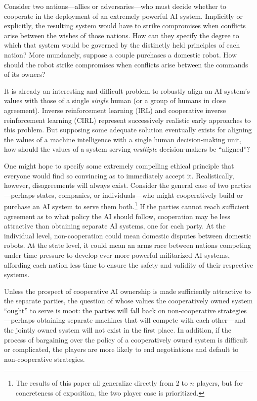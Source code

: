 \documentclass{article}  %
\begin{document}
Consider two nations---allies or adversaries---who must decide whether to cooperate in the deployment of an extremely powerful AI system.  Implicitly or explicitly, the resulting system would have to strike compromises when conflicts arise between the wishes of those nations.  How can they specify the degree to which that system would be governed by the distinctly held principles of each nation?  More mundanely, suppose a couple purchases a domestic robot.  How should the robot strike compromises when conflicts arise between the commands of its owners?

It is already an interesting and difficult problem to robustly align an AI system's values with those of a single \emph{single} human (or a group of humans in close agreement).  Inverse reinforcement learning (IRL) \cite{Ru98} \cite{NR00} \cite {AN04} and cooperative inverse reinforcement learning (CIRL) \cite{HDAR16} represent successively realistic early approaches to this problem.  But supposing some adequate solution eventually exists for aligning the values of a machine intelligence with a single human decision-making unit, how should the values of a system serving \emph{multiple} decision-makers be ``aligned''?

One might hope to specify some extremely compelling ethical principle that everyone would find so convincing as to immediately accept it.  Realistically, however, disagreements will always exist.  Consider the general case of two parties---perhaps states, companies, or individuals---who might cooperatively build or purchase an AI system to serve them both.\footnote{The results of this paper all generalize directly from $2$ to $n$ players, but for concreteness of exposition, the two player case is prioritized.}   If the parties cannot reach sufficient agreement as to what policy the AI should follow, cooperation may be less attractive than obtaining separate AI systems, one for each party.  At the individual level, non-cooperation could mean domestic disputes between domestic robots.  At the state level, it could mean an arms race between nations competing under time pressure to develop ever more powerful militarized AI systems, affording each nation less time to ensure the safety and validity of their respective systems.

Unless the prospect of cooperative AI ownership is made sufficiently attractive to the separate parties, the question of whose values the cooperatively owned system ``ought'' to serve is moot:  the parties will fall back on non-cooperative strategies---perhaps obtaining separate machines that will compete with each other---and the jointly owned system will not exist in the first place.   In addition, if the process of bargaining over the policy of a cooperatively owned system is difficult or complicated, the players are more likely to end negotiations and default to non-cooperative strategies. 
\end{document}
